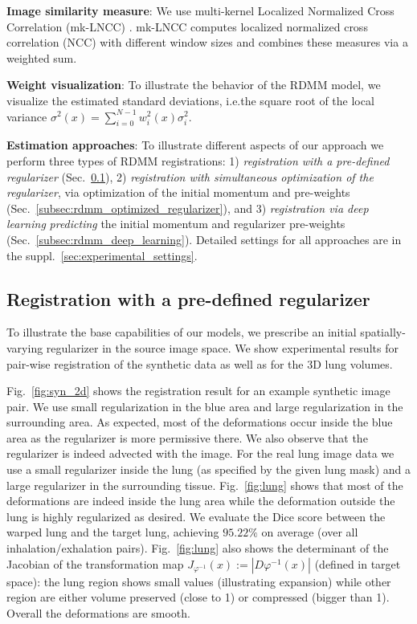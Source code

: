 \documentclass{article}
\numberwithin{equation}{section}
\newcommand{\ie}{{i.e.}}
\begin{document}
{\bf Image similarity measure}: We use multi-kernel Localized Normalized Cross Correlation (mk-LNCC) \cite{shen2019networks}. mk-LNCC computes localized normalized cross correlation (NCC) with different window sizes and combines these measures via a weighted sum.

{\bf Weight visualization}: To illustrate the behavior of the RDMM model, we visualize the estimated standard deviations, \ie the square root of the local variance $\sigma^{2}(x)=\sum_{i=0}^{N-1} w^2_{i}(x) \sigma_{i}^{2}$.

{\bf Estimation approaches}: To illustrate different aspects of our approach we perform three types of RDMM registrations: 1) {\it registration with a pre-defined regularizer} (Sec.~\ref{subsec:rdmm_predefined}), 2) {\it registration with simultaneous optimization of the regularizer}, via optimization of the initial momentum and pre-weights (Sec.~\ref{subsec:rdmm_optimized_regularizer}), and 3) {\it registration via deep learning} \emph{predicting} the initial momentum and regularizer pre-weights (Sec.~\ref{subsec:rdmm_deep_learning}). Detailed settings for all approaches are in the suppl.~\ref{sec:experimental_settings}.




\subsection {Registration with a pre-defined regularizer}
\label{subsec:rdmm_predefined}

To illustrate the base capabilities of our models, we prescribe an initial spatially-varying regularizer in the source image space. We show experimental results for pair-wise registration of the synthetic data as well as for the 3D lung volumes.

Fig.~\ref{fig:syn_2d} shows the registration result for an example synthetic image pair. We use small regularization in the blue area and large regularization in the surrounding area. As expected, most of the deformations occur inside the blue area as the regularizer is more permissive there. We also observe that the regularizer is indeed advected with the image. For the real lung image data we use a small regularizer inside the lung (as specified by the given lung mask) and a large regularizer in the surrounding tissue. Fig.~\ref{fig:lung} shows that most of the deformations are indeed inside the lung area while the deformation outside the lung is highly regularized as desired. We evaluate the Dice score between the warped lung and the target lung, achieving $95.22\%$ on average (over all inhalation/exhalation pairs). Fig.~\ref{fig:lung} also shows the determinant of the Jacobian of the transformation map $J_{\varphi^{-1}}(x) := |D{\varphi^{-1}}(x)|$ (defined in target space): the lung region shows small values (illustrating expansion) while other region are either volume preserved (close to 1) or compressed (bigger than 1). Overall the deformations are smooth.
\end{document}
